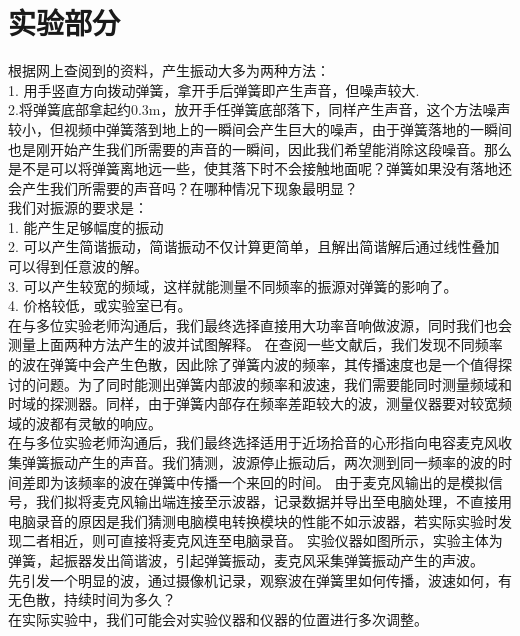 \documentclass[UTF8,9pt]{report}
\begin{document}
\chapter{实验部分}
    根据网上查阅到的资料，产生振动大多为两种方法：\\
    1. 用手竖直方向拨动弹簧，拿开手后弹簧即产生声音，但噪声较大.\\
    2.将弹簧底部拿起约0.3m，放开手任弹簧底部落下，同样产生声音，这个方法噪声较小，但视频中弹簧落到地上的一瞬间会产生巨大的噪声，由于弹簧落地的一瞬间也是刚开始产生我们所需要的声音的一瞬间，因此我们希望能消除这段噪音。{\color{red}那么是不是可以将弹簧离地远一些，使其落下时不会接触地面呢？弹簧如果没有落地还会产生我们所需要的声音吗？在哪种情况下现象最明显？}\\
    我们对振源的要求是：\\
    1. 能产生足够幅度的振动\\
    2. 可以产生简谐振动，简谐振动不仅计算更简单，且解出简谐解后通过线性叠加可以得到任意波的解。\\
    3. 可以产生较宽的频域，这样就能测量不同频率的振源对弹簧的影响了。\\
    4. 价格较低，或实验室已有。\\
    在与多位实验老师沟通后，我们最终选择直接用大功率音响做波源，同时我们也会测量上面两种方法产生的波并试图解释。
    在查阅一些文献后，我们发现不同频率的波在弹簧中会产生色散，因此除了弹簧内波的频率，其传播速度也是一个值得探讨的问题。为了同时能测出弹簧内部波的频率和波速，我们需要能同时测量频域和时域的探测器。同样，由于弹簧内部存在频率差距较大的波，测量仪器要对较宽频域的波都有灵敏的响应。\\
    在与多位实验老师沟通后，我们最终选择适用于近场拾音的心形指向电容麦克风收集弹簧振动产生的声音。我们猜测，波源停止振动后，两次测到同一频率的波的时间差即为该频率的波在弹簧中传播一个来回的时间。\label{time}
    由于麦克风输出的是模拟信号，我们拟将麦克风输出端连接至示波器，记录数据并导出至电脑处理，不直接用电脑录音的原因是我们猜测电脑模电转换模块的性能不如示波器，若实际实验时发现二者相近，则可直接将麦克风连至电脑录音。
实验仪器如图所示，实验主体为弹簧，起振器发出简谐波，引起弹簧振动，麦克风采集弹簧振动产生的声波。\\
    先引发一个明显的波，通过摄像机记录，观察波在弹簧里如何传播，波速如何，有无色散，持续时间为多久？\\
在实际实验中，我们可能会对实验仪器和仪器的位置进行多次调整。
\end{document}
